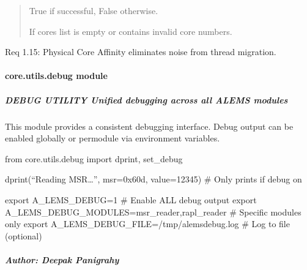 \documentclass[letterpaper,10pt,english]{sphinxmanual}
\begin{document}
\begin{fulllineitems}
\begin{fulllineitems}
\begin{quote}
\begin{description}
\sphinxAtStartPar
True if successful, False otherwise.

\sphinxAtStartPar
{} \textendash{} If cores list is empty or contains invalid core numbers.

\end{description}\end{quote}

\sphinxAtStartPar
Req 1.15: Physical Core Affinity \textendash{} eliminates noise from thread migration.

\end{fulllineitems}


\end{fulllineitems}


\sphinxstepscope


\paragraph{core.utils.debug module}
\label{\detokenize{core.utils.debug:module-core.utils.debug}}\label{\detokenize{core.utils.debug:core-utils-debug-module}}\label{\detokenize{core.utils.debug::doc}}

\subparagraph{DEBUG UTILITY \sphinxhyphen{} Unified debugging across all A\sphinxhyphen{}LEMS modules}
\label{\detokenize{core.utils.debug:debug-utility-unified-debugging-across-all-a-lems-modules}}
\sphinxAtStartPar
This module provides a consistent debugging interface. Debug output can be
enabled globally or per\sphinxhyphen{}module via environment variables.
\begin{description}
\sphinxAtStartPar
from core.utils.debug import dprint, set\_debug

\sphinxAtStartPar
dprint(“Reading MSR…”, msr=0x60d, value=12345)  \# Only prints if debug on

\sphinxAtStartPar
export A\_LEMS\_DEBUG=1           \# Enable ALL debug output
export A\_LEMS\_DEBUG\_MODULES=msr\_reader,rapl\_reader  \# Specific modules only
export A\_LEMS\_DEBUG\_FILE=/tmp/a\sphinxhyphen{}lems\sphinxhyphen{}debug.log  \# Log to file (optional)

\end{description}


\subparagraph{Author: Deepak Panigrahy}
\label{\detokenize{core.utils.debug:author-deepak-panigrahy}}
\end{document}

